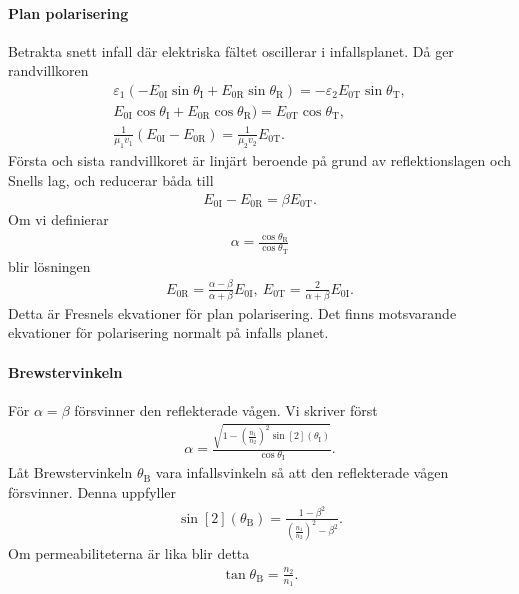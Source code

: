 \paragraph{Plan polarisering}
Betrakta snett infall där elektriska fältet oscillerar i infallsplanet. Då ger randvillkoren
\begin{align*}
	\varepsilon_{1}(-E_{0\text{I}}\sin{\theta_{\text{I}}} + E_{0\text{R}}\sin{\theta_{\text{R}}}) = -\varepsilon_{2}E_{0\text{T}}\sin{\theta_{\text{T}}}, \\
	E_{0\text{I}}\cos{\theta_{\text{I}}} + E_{0\text{R}}\cos{\theta_{\text{R}}}) = E_{0\text{T}}\cos{\theta_{\text{T}}}, \\
	\frac{1}{\mu_{1}v_{1}}(E_{0\text{I}} - E_{0\text{R}}) = \frac{1}{\mu_{2}v_{2}}E_{0\text{T}}.
\end{align*}
Första och sista randvillkoret är linjärt beroende på grund av reflektionslagen och Snells lag, och reducerar båda till
\begin{align*}
	E_{0\text{I}} - E_{0\text{R}} = \beta E_{0\text{T}}.
\end{align*}
Om vi definierar
\begin{align*}
	\alpha = \frac{\cos{\theta_{\text{R}}}}{\cos{\theta_{\text{T}}}}
\end{align*}
blir lösningen
\begin{align*}
	E_{0\text{R}} = \frac{\alpha - \beta}{\alpha + \beta}E_{0\text{I}},\ E_{0\text{T}} = \frac{2}{\alpha + \beta}E_{0\text{I}}.
\end{align*}
Detta är Fresnels ekvationer för plan polarisering. Det finns motsvarande ekvationer för polarisering normalt på infalls planet.

\paragraph{Brewstervinkeln}
För $\alpha = \beta$ försvinner den reflekterade vågen. Vi skriver först
\begin{align*}
	\alpha = \frac{\sqrt{1 - \left(\frac{n_{1}}{n_{2}}\right)^{2}\sin[2](\theta_{\text{I}})}}{\cos{\theta_{\text{I}}}}.
\end{align*}
Låt Brewstervinkeln $\theta_{\text{B}}$ vara infallsvinkeln så att den reflekterade vågen försvinner. Denna uppfyller
\begin{align*}
	\sin[2](\theta_{\text{B}}) = \frac{1 - \beta^{2}}{\left(\frac{n_{1}}{n_{2}}\right)^{2} - \beta^{2}}.
\end{align*}
Om permeabiliteterna är lika blir detta
\begin{align*}
	\tan{\theta_{\text{B}}} = \frac{n_{2}}{n_{1}}.
\end{align*}

